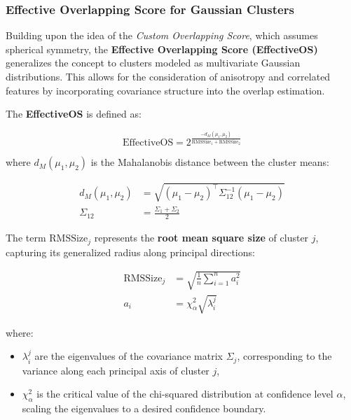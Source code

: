 \subsubsection*{Effective Overlapping Score for Gaussian Clusters}

Building upon the idea of the \textit{Custom Overlapping Score}, which assumes
spherical symmetry, the \textbf{Effective Overlapping Score (EffectiveOS)}
generalizes the concept to clusters modeled as multivariate Gaussian
distributions. This allows for the consideration of anisotropy and correlated
features by incorporating covariance structure into the overlap estimation.

The \textbf{EffectiveOS} is defined as:

\begin{equation}
      \text{EffectiveOS} = 2^{\frac{-d_M(\mu_1, \mu_2)}{\text{RMSSize}_1 + \text{RMSSize}_2}}
\end{equation}

where $ d_M(\mu_1, \mu_2) $ is the Mahalanobis distance between the cluster
means:

\begin{align}
      d_M(\mu_1, \mu_2) & = \sqrt{(\mu_1 - \mu_2)^\top \Sigma_{12}^{-1} (\mu_1 - \mu_2)} \\
      \Sigma_{12}       & = \frac{\Sigma_1 + \Sigma_2}{2}
\end{align}

The term $ \text{RMSSize}_j $ represents the \textbf{root mean square size} of
cluster $ j $, capturing its generalized radius along principal directions:

\begin{align}
      \text{RMSSize}_j & = \sqrt{\frac{1}{n} \sum_{i=1}^n a_i^2} \\
      a_i              & = \chi^2_\alpha \sqrt{\lambda_i^j}
\end{align}

where:
\begin{itemize}
      \item $ \lambda_i^j $ are the eigenvalues of the covariance matrix $ \Sigma_j $,
            corresponding to the variance along each principal axis of cluster $ j $,
      \item $ \chi^2_\alpha $ is the critical value of the chi-squared distribution at
            confidence level $ \alpha $, scaling the eigenvalues to a desired confidence boundary.
\end{itemize}

